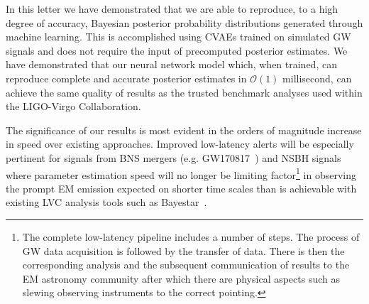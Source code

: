 \documentclass[%
showpacs,
 amsmath,amssymb,
 aps,
 twocolumn,
 prl,
 reprint,
floatfix,
]{revtex4-1}
\begin{document}
%
%
%
In this letter we have demonstrated that we are able to reproduce, to a high
degree of accuracy, Bayesian posterior probability distributions generated
through machine learning. This is accomplished using \acp{CVAE} trained on
simulated \ac{GW} signals and does not require the input of precomputed
posterior estimates. We have demonstrated that our neural network model which,
when trained, can reproduce complete and accurate posterior estimates in
$\mathcal{O}(1)$ millisecond, can achieve the same quality of results as the
trusted benchmark analyses used within the LIGO-Virgo Collaboration.

%
%
The significance of our results is most evident in the orders of magnitude
increase in speed over existing approaches. Improved low-latency alerts will be
especially pertinent for signals from \ac{BNS} mergers (e.g.
GW170817~\cite{PhysRevLett.119.161101}) and \ac{NSBH} signals where parameter
estimation speed will no longer be limiting factor\footnote{The complete
low-latency pipeline includes a number of steps. The process of \ac{GW} data
acquisition is followed by the transfer of data. There is then the
corresponding analysis and the subsequent communication of results to the
\ac{EM} astronomy community after which there are physical aspects such as
slewing observing instruments to the correct pointing.} in observing the prompt
\ac{EM} emission expected on shorter time scales than is achievable with
existing \ac{LVC} analysis tools such as Bayestar~\cite{2016PhRvD..93b4013S}.
\end{document}
